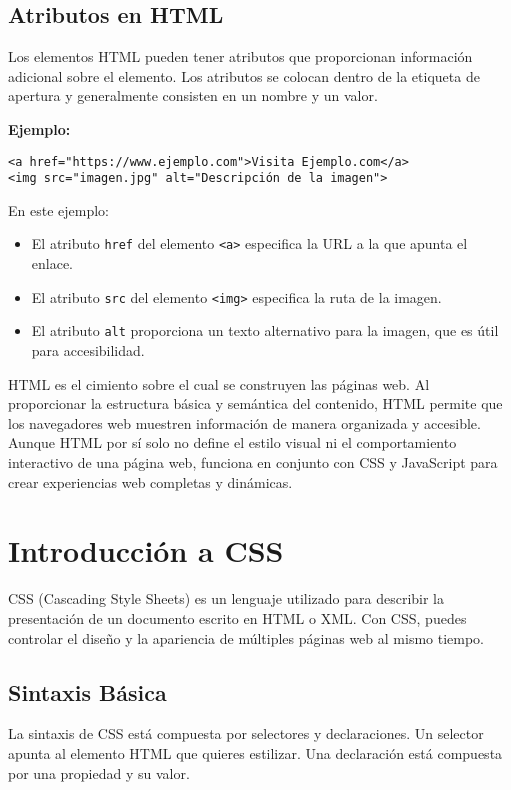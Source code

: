 \documentclass{book}
\begin{document}
\section{Atributos en HTML}
Los elementos HTML pueden tener atributos que proporcionan información adicional sobre el elemento. Los atributos se colocan dentro de la etiqueta de apertura y generalmente consisten en un nombre y un valor.

\textbf{Ejemplo:}

\begin{verbatim}
<a href="https://www.ejemplo.com">Visita Ejemplo.com</a>
<img src="imagen.jpg" alt="Descripción de la imagen">
\end{verbatim}

En este ejemplo:

\begin{itemize}
    \item El atributo \texttt{href} del elemento \texttt{<a>} especifica la URL a la que apunta el enlace.
    \item El atributo \texttt{src} del elemento \texttt{<img>} especifica la ruta de la imagen.
    \item El atributo \texttt{alt} proporciona un texto alternativo para la imagen, que es útil para accesibilidad.
\end{itemize}


HTML es el cimiento sobre el cual se construyen las páginas web. Al proporcionar la estructura básica y semántica del contenido, HTML permite que los navegadores web muestren información de manera organizada y accesible. Aunque HTML por sí solo no define el estilo visual ni el comportamiento interactivo de una página web, funciona en conjunto con CSS y JavaScript para crear experiencias web completas y dinámicas.

\chapter{Introducción a CSS}

CSS (Cascading Style Sheets) es un lenguaje utilizado para describir la presentación de un documento escrito en HTML o XML. Con CSS, puedes controlar el diseño y la apariencia de múltiples páginas web al mismo tiempo.

\section{Sintaxis Básica}

La sintaxis de CSS está compuesta por selectores y declaraciones. Un selector apunta al elemento HTML que quieres estilizar. Una declaración está compuesta por una propiedad y su valor.
\end{document}
